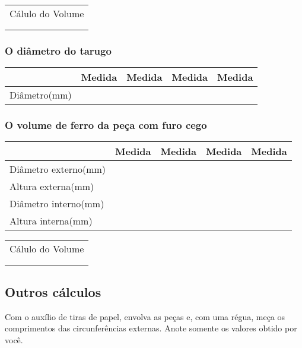 \begin{table}[h]
\centering
\begin{tabular}{|p{10cm}|}
\hline Cálulo do Volume \\ 
\\
\\
\hline
\end{tabular}
\end{table}

\subsubsection{O diâmetro do tarugo} 
\begin{table}[h]
\centering
\begin{tabular}{|l|*{4}{c|}}
\hline & Medida& Medida& Medida& Medida \\
\hline Diâmetro(mm)& & &  & \\ 
\hline
\end{tabular}

\end{table}

\subsubsection{O volume de ferro da peça com furo cego} 

\begin{table}[ht]
\centering
\begin{tabular}{|l|*{4}{c|}}
\hline & Medida& Medida& Medida& Medida \\
\hline Diâmetro externo(mm)& & &  & \\ 
\hline Altura externa(mm)& & &  & \\ 
\hline Diâmetro interno(mm)& & &  & \\ 
\hline Altura interna(mm)& & &  & \\ 
\hline
\end{tabular}

\end{table}

\begin{table}[h]
\centering
\begin{tabular}{|p{10cm}|}
\hline Cálulo do Volume \\ 
\\
\\
\hline
\end{tabular}
\end{table}

\subsection{Outros cálculos}
Com o auxílio de tiras de papel, envolva as peças e, com uma régua, meça os comprimentos das circunferências externas. Anote somente os valores obtido por você.

